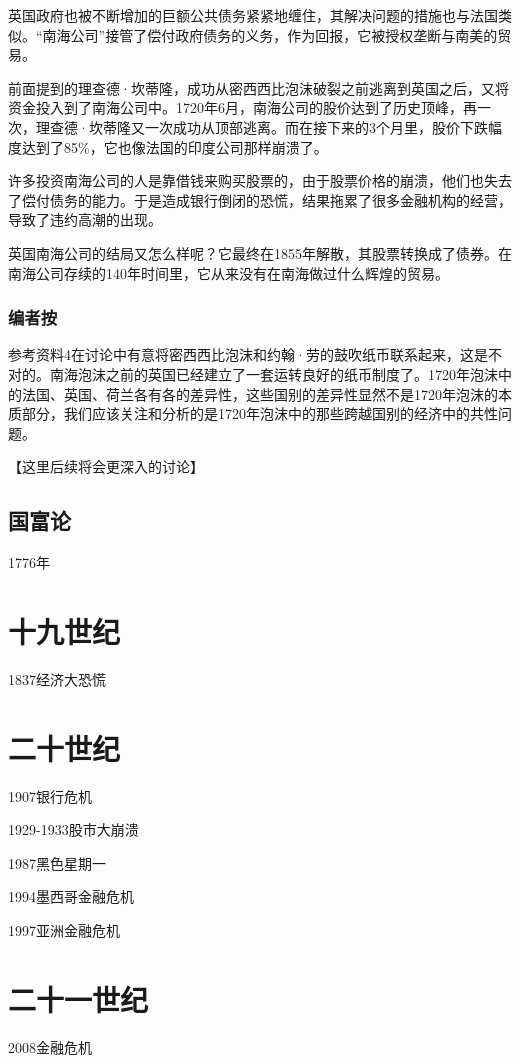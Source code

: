 \documentclass[12pt,oneside]{book}
\begin{document}
英国政府也被不断增加的巨额公共债务紧紧地缠住，其解决问题的措施也与法国类似。“南海公司”接管了偿付政府债务的义务，作为回报，它被授权垄断与南美的贸易。

前面提到的理查德·坎蒂隆，成功从密西西比泡沫破裂之前逃离到英国之后，又将资金投入到了南海公司中。1720年6月，南海公司的股价达到了历史顶峰，再一次，理查德·坎蒂隆又一次成功从顶部逃离。而在接下来的3个月里，股价下跌幅度达到了85\%，它也像法国的印度公司那样崩溃了。

许多投资南海公司的人是靠借钱来购买股票的，由于股票价格的崩溃，他们也失去了偿付债务的能力。于是造成银行倒闭的恐慌，结果拖累了很多金融机构的经营，导致了违约高潮的出现。

英国南海公司的结局又怎么样呢？它最终在1855年解散，其股票转换成了债券。在南海公司存续的140年时间里，它从来没有在南海做过什么辉煌的贸易。


\section{编者按}
参考资料4在讨论中有意将密西西比泡沫和约翰·劳的鼓吹纸币联系起来，这是不对的。南海泡沫之前的英国已经建立了一套运转良好的纸币制度了。1720年泡沫中的法国、英国、荷兰各有各的差异性，这些国别的差异性显然不是1720年泡沫的本质部分，我们应该关注和分析的是1720年泡沫中的那些跨越国别的经济中的共性问题。

【这里后续将会更深入的讨论】


\chapter{国富论}
1776年


\part{十九世纪}
1837经济大恐慌

\part{二十世纪}
1907银行危机

1929-1933股市大崩溃

1987黑色星期一

1994墨西哥金融危机

1997亚洲金融危机


\part{二十一世纪}
2008金融危机
\end{document}
